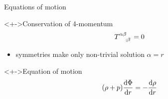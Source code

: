 \documentclass{beamer}
\let\svthefootnote\thefootnote
\newcommand\blankfootnote[1]{%
  \let\thefootnote\relax\footnotetext{#1}%
  \let\thefootnote\svthefootnote%
}
\begin{document}
\begin{frame}{Equations of motion}

\begin{block}<+->{Conservation of 4-momentum}
\begin{displaymath}
  \tensor{T}{^{\alpha\beta}_{;\beta}} = 0
\end{displaymath}
\end{block}

\begin{itemize}
\item<+-> symmetries make only non-trivial solution $\alpha = r$
\end{itemize}

\begin{block}<+->{Equation of motion}
\begin{displaymath}
  (\rho + p) \dv{\Phi}{r} = -\dv{\rho}{r}
\end{displaymath}
\end{block}

\blankfootnote{\textcite[pp. 175, 261]{Schutz}}



\end{frame}

\end{document}
